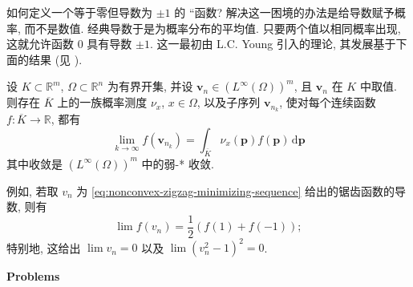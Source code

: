 如何定义一个等于零但导数为 $\pm1$ 的 ``函数\textquotesingle\textquotesingle? 解决这一困境的办法是给导数赋予概率, 而不是数值. 经典导数于是为概率分布的平均值. 只要两个值以相同概率出现, 这就允许函数 0 具有导数 $\pm1$. 这一最初由 L.C. Young 引入的理论, 其发展基于下面的结果 (见 \cite{Dac}).

\begin{Theorem}
\label{thm:young-measure-subsequence-existence}
设 $K\subset\mathbb{R}^m$, $\Omega\subset\mathbb{R}^n$ 为有界开集, 并设 $\bm{v}_n\in(L^\infty(\Omega))^m$, 且 $\bm{v}_n$ 在 $K$ 中取值. 则存在 $\overline K$ 上的一族概率测度 $\nu_x$, $x\in\Omega$, 以及子序列 $\bm{v}_{n_k}$, 使对每个连续函数 $f:\overline K\to\mathbb{R}$, 都有
\begin{equation}\label{eq:young-measure-continuous-composition-weak-star-limit}
\lim_{k\to\infty}f(\bm{v}_{n_k})=\int_{\overline K}\nu_x(\bm{p})f(\bm{p})\,\mathrm{d}\bm{p}
\end{equation}
其中收敛是 $(L^\infty(\Omega))^m$ 中的弱-* 收敛.
\end{Theorem}

例如, 若取 $v_n$ 为 \eqref{eq:nonconvex-zigzag-minimizing-sequence} 给出的锯齿函数的导数, 则有
\begin{equation}\label{eq:zigzag-derivative-young-measure-composition-limit}
\lim f(v_n)=\dfrac{1}{2}(f(1)+f(-1));
\end{equation}
特别地, 这给出 $\lim v_n=0$ 以及 $\lim(v_n^2-1)^2=0$.

\textbf{Problems}

